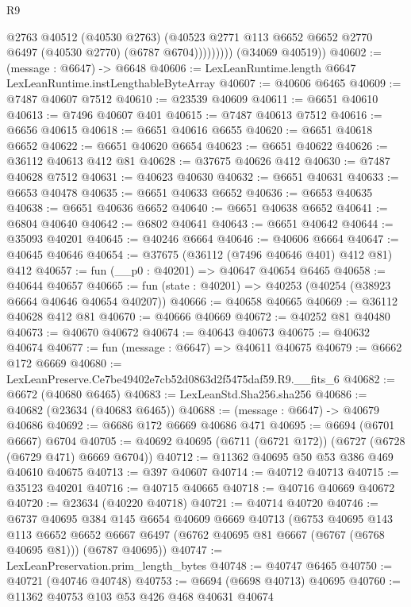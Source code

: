 \begin{lexlean}{R9}
\begin{coremodule}
                    @2763
                    @40512
                    (@40530 @2763)
                    (@40523 @2771 @113 @6652 @6652 @2770 @6497 (@40530 @2770) (@6787 @6704)))))))))
      (@34069 @40519))
@40602 := (message : @6647) -> @6648
@40606 := LexLeanRuntime.length @6647 LexLeanRuntime.instLengthableByteArray
@40607 := @40606 @6465
@40609 := @7487 @40607 @7512
@40610 := @23539 @40609
@40611 := @6651 @40610
@40613 := @7496 @40607 @401
@40615 := @7487 @40613 @7512
@40616 := @6656 @40615
@40618 := @6651 @40616 @6655
@40620 := @6651 @40618 @6652
@40622 := @6651 @40620 @6654
@40623 := @6651 @40622
@40626 := @36112 @40613 @412 @81
@40628 := @37675 @40626 @412
@40630 := @7487 @40628 @7512
@40631 := @40623 @40630
@40632 := @6651 @40631
@40633 := @6653 @40478
@40635 := @6651 @40633 @6652
@40636 := @6653 @40635
@40638 := @6651 @40636 @6652
@40640 := @6651 @40638 @6652
@40641 := @6804 @40640
@40642 := @6802 @40641
@40643 := @6651 @40642
@40644 := @35093 @40201
@40645 := @40246 @6664
@40646 := @40606 @6664
@40647 := @40645 @40646
@40654 := @37675 (@36112 (@7496 @40646 @401) @412 @81) @412
@40657 := fun (__p0 : @40201) => @40647 @40654 @6465
@40658 := @40644 @40657
@40665 := fun (state : @40201) => @40253 (@40254 (@38923 @6664 @40646 @40654 @40207))
@40666 := @40658 @40665
@40669 := @36112 @40628 @412 @81
@40670 := @40666 @40669
@40672 := @40252 @81 @40480
@40673 := @40670 @40672
@40674 := @40643 @40673
@40675 := @40632 @40674
@40677 := fun (message : @6647) => @40611 @40675
@40679 := @6662 @172 @6669
@40680 := LexLeanPreserve.Ce7be49402e7cb52d0863d2f5475daf59.R9.__fits_6
@40682 := @6672 (@40680 @6465)
@40683 := LexLeanStd.Sha256.sha256
@40686 := @40682 (@23634 (@40683 @6465))
@40688 := (message : @6647) -> @40679 @40686
@40692 := @6686 @172 @6669 @40686 @471
@40695 := @6694 (@6701 @6667) @6704
@40705 := @40692 @40695 (@6711 (@6721 @172)) (@6727 (@6728 (@6729 @471) @6669 @6704))
@40712 := @11362 @40695 @50 @53 @386 @469 @40610 @40675
@40713 := @397 @40607
@40714 := @40712 @40713
@40715 := @35123 @40201
@40716 := @40715 @40665
@40718 := @40716 @40669 @40672
@40720 := @23634 (@40220 @40718)
@40721 := @40714 @40720
@40746 := @6737
    @40695
    @384
    @145
    @6654
    @40609
    @6669
    @40713
    (@6753
      @40695
      @143
      @113
      @6652
      @6652
      @6667
      @6497
      (@6762 @40695 @81 @6667 (@6767 (@6768 @40695 @81)))
      (@6787 @40695))
@40747 := LexLeanPreservation.prim_length_bytes
@40748 := @40747 @6465
@40750 := @40721 (@40746 @40748)
@40753 := @6694 (@6698 @40713) @40695
@40760 := @11362 @40753 @103 @53 @426 @468 @40631 @40674

\end{coremodule}
\end{lexlean}

